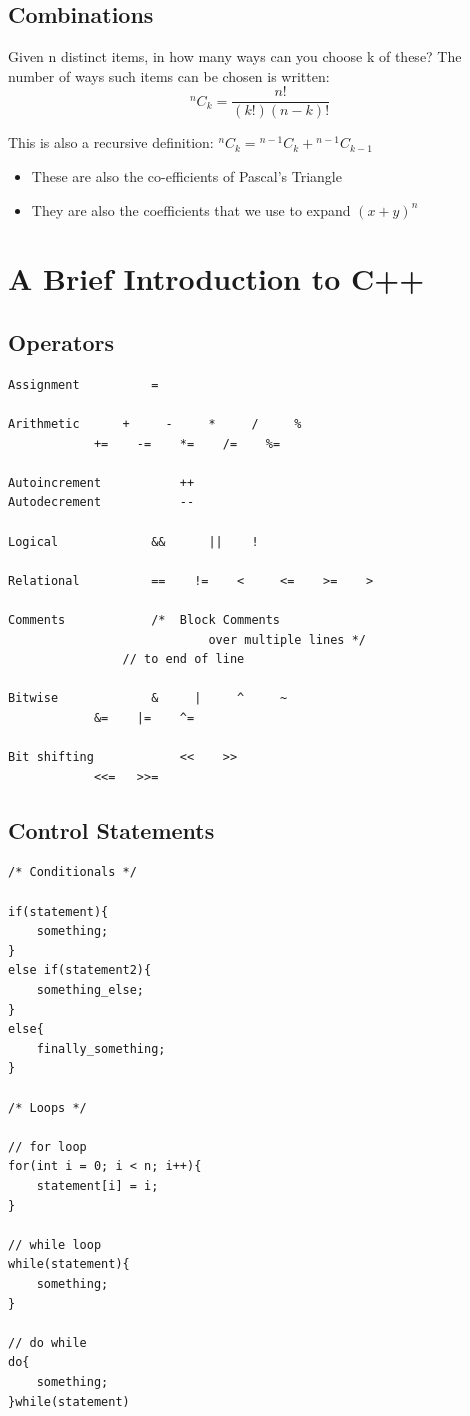 \documentclass[11pt]{article}
\theoremstyle{definition}
\newcommand*{\Co}[2]{{}^{#1}C_{#2}}%
\begin{document}
\newpage
\subsection{Combinations}
Given n distinct items, in how many ways can you choose k of these?
The number of ways such items can be chosen is written:
$$\Co{n}{k} = \frac{n!}{(k!)(n-k)!}$$

This is also a recursive definition:
$\Co{n}{k} = \Co{n-1}{k} + \Co{n-1}{k-1}$

\begin{itemize}[label={--}]
\item These are also the co-efficients of Pascal's Triangle
\item They are also the coefficients that we use to expand $(x+y)^n$
\end{itemize}

\newpage
\section{A Brief Introduction to C++}

\subsection{Operators}
\begin{lstlisting}
Assignment	        =

Arithmetic		+     -     *     /     %
			+=    -=    *=    /=    %=
			
Autoincrement	        ++
Autodecrement	        --

Logical		        &&      ||    !

Relational	        ==    !=    <     <=    >=    >

Comments	        /*  Block Comments 
                            over multiple lines */
		        // to end of line
			
Bitwise		        &     |     ^     ~
			&=    |=    ^=
				
Bit shifting	        <<    >>
			<<=   >>=
\end{lstlisting}
\subsection{Control Statements}
\begin{lstlisting}
/* Conditionals */

if(statement){
    something;
}
else if(statement2){
    something_else;
}
else{
    finally_something;
}

/* Loops */

// for loop
for(int i = 0; i < n; i++){
    statement[i] = i;
}

// while loop
while(statement){
    something;
}

// do while
do{
    something;
}while(statement)

\end{lstlisting}
\newpage
\end{document}
